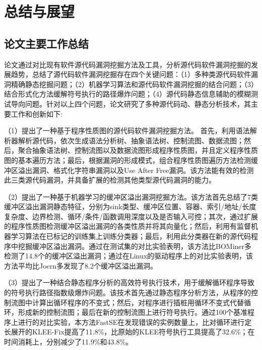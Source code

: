 \chapter{总结与展望}

\section{论文主要工作总结}

论文通过对比现有软件源代码漏洞挖掘方法及工具，分析源代码软件漏洞挖掘的发展趋势，总结了源代码软件漏洞挖掘存在四个关键问题：（1）多种类源代码软件漏洞精确静态挖掘问题；（2）机器学习算法和源代码软件漏洞挖掘的结合问题；（3）结合形式化方法缓解符号执行的路径爆炸问题；（4）源代码静态信息辅助的模糊测试导向问题。针对以上四个问题，论文研究了多种源代码动、静态分析技术，其主要工作和创新如下:

（1）提出了一种基于程序性质图的源代码软件漏洞挖掘方法。
首先，利用语法解析器解析源代码，依次生成语法分析树、抽象语法树、控制流图、数据流图；然后，聚合抽象语法树、控制流图以及数据流图形成程序性质图，并且定义程序性质图的基本遍历方法；最后，根据漏洞的形成模式，组合程序性质图遍历方法检测缓冲区溢出漏洞、格式化字符串漏洞以及Use After Free漏洞。该方法能有效的检测此三类源代码漏洞，并具备扩展的检测其他类型源代码漏洞的能力。

（2）提出了一种基于机器学习的缓冲区溢出漏洞挖掘方法。该方法首先总结了7类缓冲区溢出漏洞静态特征，分别为sink类型、缓冲区位置、容器、索引/地址/长度复杂度、边界检测、循环/条件/函数调用深度以及是否输入可控；其次，通过扩展的程序性质图检测缓冲区溢出漏洞的各类性质并将其向量化；然后，利用有监督机器学习算法在已标记的训练集上训练分类器；最后，利用此分类器在新的源代码程序中挖掘缓冲区溢出漏洞。通过在测试集的对比实验表明，该方法比BOMiner多检测了14.8个的缓冲区溢出漏洞；通过在Linux的驱动程序上的对比实验表明，该方法平均比Joern多发现了8.2个缓冲区溢出漏洞。

（3）提出了一种结合静态程序分析的高效符号执行技术，用于缓解循环程序导致的符号执行路径指数级爆炸问题。该技术首先通过静态程序分析方法，从程序的控制流图中计算出循环程序的不变式；然后，对程序进行插桩用循环不变式代替循环，形成新的控制流图；最后在新的控制流图上进行符号执行。通过100个基准程序上进行的对比实验，本方法FastSE在发现错误的实例数量上，比对循环进行定长展开的KLEE-Fix提高了11.8\%，比原始的KLEE符号执行工具提高了32.6\%；在时间消耗上，分别减少了11.9\%和43.8\%。


